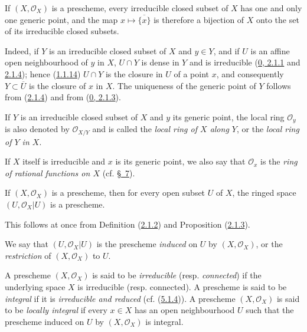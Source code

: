 \begin{proposition}[2.1.5]
\label{I.2.1.5}
If $(X,\mathscr{O}_X)$ is a prescheme, every irreducible closed subset of
$X$ has one and only one generic point, and the map
$x\longmapsto\overline{\{x\}}$ is therefore a bijection of $X$ onto the set
of its irreducible closed subsets.
\end{proposition}

Indeed, if $Y$ is an irreducible closed subset of $X$ and $y\in Y$, and if
$U$ is an affine open neighbourhood of $y$ in $X$, $U\cap Y$ is dense in $Y$
and is irreducible
(\hyperref[0.2.1.1]{0, 2.1.1} and
\hyperref[0.2.1.4]{2.1.4}); hence
(\hyperref[I.1.1.14]{1.1.14}) $U\cap Y$ is the closure in $U$ of a
point $x$, and consequently $Y\subset\overline{U}$ is the closure of $x$ in
$X$. The uniqueness of the generic point of $Y$ follows from
(\hyperref[I.2.1.4]{2.1.4}) and from
(\hyperref[0.2.1.3]{0, 2.1.3}).

\begin{env}[2.1.6]
\label{I.2.1.6}
If $Y$ is an irreducible closed subset of $X$ and $y$ its generic point,
the local ring $\mathscr{O}_y$ is also denoted by $\mathscr{O}_{X/Y}$ and is
called the \emph{local ring of $X$ along $Y$}, or the \emph{local ring of $Y$
in $X$}.

If $X$ itself is irreducible and $x$ is its generic point, we also say
that $\mathscr{O}_x$ is the \emph{ring of rational functions on
$X$} (cf. \hyperref[section:I.7]{§~7}).
\end{env}

\begin{proposition}[2.1.7]
\label{I.2.1.7}
If $(X,\mathscr{O}_X)$ is a prescheme, then for every open subset $U$ of
$X$, the ringed space $(U,\mathscr{O}_X|U)$ is a prescheme.
\end{proposition}

This follows at once from Definition (\hyperref[I.2.1.2]{2.1.2}) and
Proposition (\hyperref[I.2.1.3]{2.1.3}).

We say that $(U,\mathscr{O}_X|U)$ is the prescheme \emph{induced} on $U$ by
$(X,\mathscr{O}_X)$, or the \emph{restriction} of $(X,\mathscr{O}_X)$ to $U$.

\begin{env}[2.1.8]
\label{I.2.1.8}
A prescheme $(X,\mathscr{O}_X)$ is said to be \emph{irreducible} (resp.
\emph{connected}) if the underlying space $X$ is irreducible (resp.
connected). A prescheme is said to be \emph{integral} if it is
\emph{irreducible and reduced} (cf. (\hyperref[I.5.1.4]{5.1.4})). A
prescheme $(X,\mathscr{O}_X)$ is said to be \emph{locally integral} if every
$x\in X$ has an open neighbourhood $U$ such that the prescheme induced on $U$
by $(X,\mathscr{O}_X)$ is integral.
\end{env}

